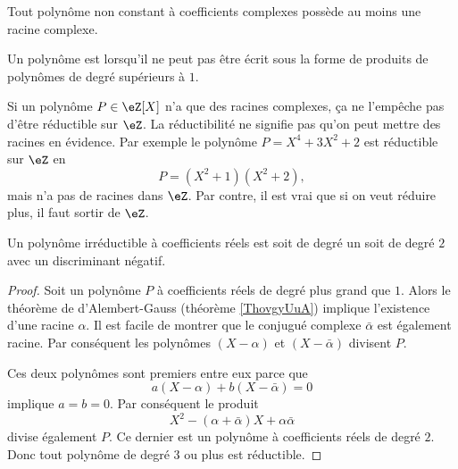 \begin{theorem}      \label{ThovgyUuA}
    Tout polynôme non constant à coefficients complexes possède au moins une racine complexe.
\end{theorem}

\begin{definition}      \label{DefIrredfIqydS}
    Un polynôme est  lorsqu'il ne peut pas être écrit sous la forme de produits de polynômes de degré supérieurs à \( 1\).
\end{definition}

\begin{example}
    Si un polynôme \( P\in \eZ[X]\) n'a que des racines complexes, ça ne l'empêche pas d'être réductible sur \( \eZ\). La réductibilité ne signifie pas qu'on peut mettre des racines en évidence. Par exemple le polynôme \( P=X^4+3X^2+2\) est réductible sur \( \eZ\) en
    \begin{equation}
        P=(X^2+1)(X^2+2),
    \end{equation}
    mais n'a pas de racines dans \( \eZ\). Par contre, il est vrai que si on veut réduire plus, il faut sortir de \( \eZ\).

\end{example}

\begin{proposition}
    Un polynôme irréductible à coefficients réels est soit de degré un soit de degré \( 2\) avec un discriminant négatif.
\end{proposition}

\begin{proof}
    Soit un polynôme \( P\) à coefficients réels de degré plus grand que \( 1\). Alors le théorème de d'Alembert-Gauss (théorème \ref{ThovgyUuA}) implique l'existence d'une racine \( \alpha\). Il est facile de montrer que le conjugué complexe \( \bar \alpha\) est également racine. Par conséquent les polynômes \( (X-\alpha)\) et \( (X-\bar \alpha)\) divisent \( P\).

    Ces deux polynômes sont premiers entre eux parce que
    \begin{equation}
        a(X-\alpha)+b(X-\bar \alpha)=0
    \end{equation}
    implique \( a=b=0\). Par conséquent le produit 
    \begin{equation}
        X^2-(\alpha+\bar \alpha)X+\alpha\bar\alpha
    \end{equation}
    divise également \( P\). Ce dernier est un polynôme à coefficients réels de degré \( 2\). Donc tout polynôme de degré \( 3\) ou plus est réductible.
\end{proof}

